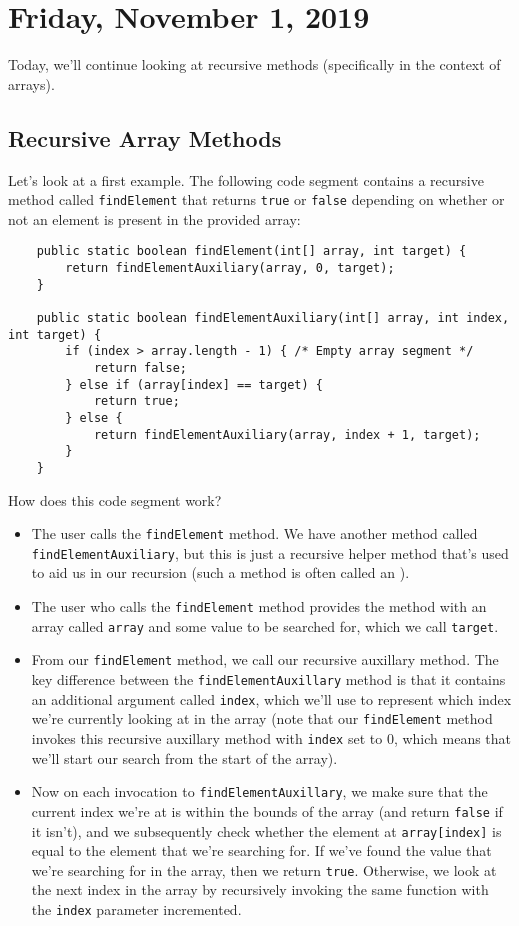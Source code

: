 \section{Friday, November 1, 2019}

Today, we'll continue looking at recursive methods (specifically in the context of arrays).

\subsection{Recursive Array Methods}

Let's look at a first example. The following code segment contains a recursive method called \verb!findElement! that returns \verb!true! or \verb!false! depending on whether or not an element is present in the provided array:

\begin{lstlisting}
	public static boolean findElement(int[] array, int target) {
		return findElementAuxiliary(array, 0, target);
	}

	public static boolean findElementAuxiliary(int[] array, int index, int target) {
		if (index > array.length - 1) { /* Empty array segment */
			return false;
		} else if (array[index] == target) {
			return true;
		} else {
			return findElementAuxiliary(array, index + 1, target);
		}
	}
\end{lstlisting}

How does this code segment work?

\begin{itemize}
    \item The user calls the \verb!findElement! method. We have another method called \verb!findElementAuxiliary!, but this is just a recursive helper method that's used to aid us in our recursion (such a method is often called an ). 
    \item The user who calls the \verb!findElement! method provides the method with an array called \verb!array! and some value to be searched for, which we call \verb!target!. 
    \item From our \verb!findElement! method, we call our recursive auxillary method. The key difference between the \verb!findElementAuxillary! method is that it contains an additional argument called \verb!index!, which we'll use to represent which index we're currently looking at in the array (note that our \verb!findElement! method invokes this recursive auxillary method with \verb!index! set to $0$, which means that we'll start our search from the start of the array).
    \item Now on each invocation to \verb!findElementAuxillary!, we make sure that the current index we're at is within the bounds of the array (and return \verb!false! if it isn't), and we subsequently check whether the element at \verb!array[index]! is equal to the element that we're searching for. If we've found the value that we're searching for in the array, then we return \verb!true!. Otherwise, we look at the next index in the array by recursively invoking the same function with the \verb!index! parameter incremented.
\end{itemize}

